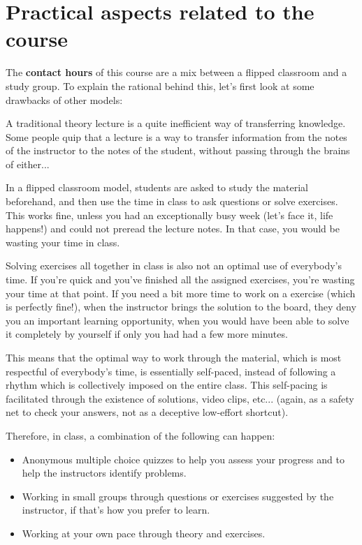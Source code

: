 \chapter{Practical aspects related to the course}

The \textbf{contact hours} of this course are a mix between a flipped classroom and a study group. To explain the rational behind this, let's first look at some drawbacks of other models:

A traditional theory lecture is a quite inefficient way of transferring knowledge. Some people quip that a lecture is a way to transfer information from the notes of the instructor to the notes of the student, without passing through the brains of either...

In a flipped classroom model, students are asked to study the material beforehand, and then use the time in class to ask questions or solve exercises. This works fine, unless you had an exceptionally busy week (let's face it, life happens!) and could not preread the lecture notes. In that case, you would be wasting your time in class.

Solving exercises all together in class is also not an optimal use of everybody's time. If you're quick and you've finished all the assigned exercises, you're wasting your time at that point. If you need a bit more time to work on a exercise (which is perfectly fine!), when the instructor brings the solution to the board, they deny you an important learning opportunity, when you would have been able to solve it completely by yourself if only you had had a few more minutes.

This means that the optimal way to work through the material, which is most respectful of everybody's time, is essentially self-paced, instead of following a rhythm which is collectively imposed on the entire class. This self-pacing is facilitated through the existence of solutions, video clips, etc... (again, as a safety net to check your answers, not as a deceptive low-effort shortcut).

Therefore, in class, a combination of the following can happen:

\begin{itemize}
\item Anonymous multiple choice quizzes to help you assess your progress and to help the instructors identify problems.
\item Working in small groups through questions or exercises suggested by the instructor, if that's how you prefer to learn.
\item Working at your own pace through theory and exercises.   
\end{itemize}

